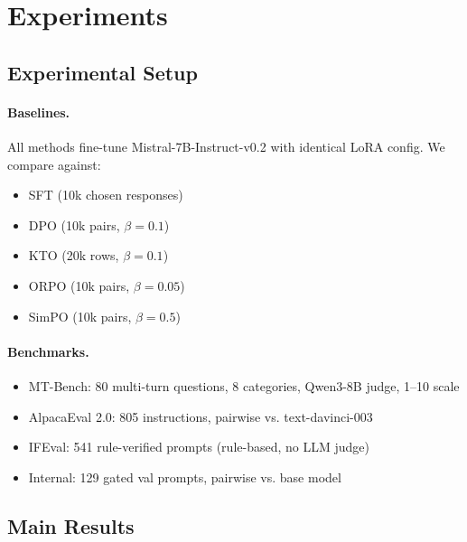 \documentclass{article}
\begin{document}
\section{Experiments}
\label{sec:experiments}

\subsection{Experimental Setup}

\paragraph{Baselines.}
All methods fine-tune Mistral-7B-Instruct-v0.2 with identical LoRA config. We compare against:
\begin{itemize}[leftmargin=*,itemsep=0.5ex]
  \item SFT (10k chosen responses)
  \item DPO (10k pairs, $\beta{=}0.1$)
  \item KTO (20k rows, $\beta{=}0.1$)
  \item ORPO (10k pairs, $\beta{=}0.05$)
  \item SimPO (10k pairs, $\beta{=}0.5$)
\end{itemize}

\paragraph{Benchmarks.}
\begin{itemize}[leftmargin=*,itemsep=0.5ex]
  \item MT-Bench: 80 multi-turn questions, 8 categories, Qwen3-8B judge, 1--10 scale
  \item AlpacaEval 2.0: 805 instructions, pairwise vs. text-davinci-003
  \item IFEval: 541 rule-verified prompts (rule-based, no LLM judge)
  \item Internal: 129 gated val prompts, pairwise vs. base model
\end{itemize}

\subsection{Main Results}
\end{document}
